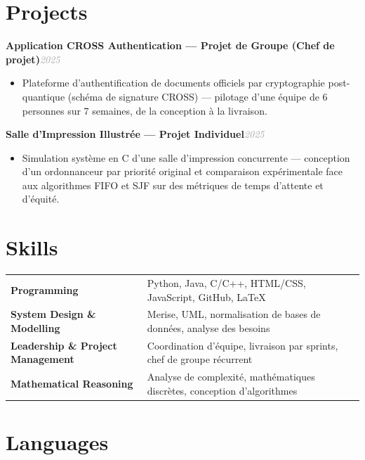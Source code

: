 \documentclass[10pt, a4paper]{article}
\newcommand{\entryhead}[2]{%
  \noindent\textbf{#1}\hfill{\small\textit{\textcolor{darkgray}{#2}}}\\[-4pt]%
}
\begin{document}
\section{Projects}

\entryhead{Application CROSS Authentication \normalfont\small— Projet de Groupe (Chef de projet)}{2025}
\begin{itemize}
  \item Plateforme d'authentification de documents officiels par cryptographie post-quantique
        (schéma de signature CROSS) — pilotage d'une équipe de 6 personnes sur 7 semaines,
        de la conception à la livraison.
\end{itemize}

\entryhead{Salle d'Impression Illustrée \normalfont\small— Projet Individuel}{2025}
\begin{itemize}
  \item Simulation système en C d'une salle d'impression concurrente — conception d'un
        ordonnanceur par priorité original et comparaison expérimentale face aux algorithmes
        FIFO et SJF sur des métriques de temps d'attente et d'équité.
\end{itemize}

\section{Skills}

\vspace{2pt}
\noindent
\begin{tabularx}{\linewidth}{@{} >{\bfseries}p{5.4cm} X @{}}
  Programming
    & Python, Java, C/C++, HTML/CSS, JavaScript, GitHub, \LaTeX \\[1pt]
  System Design \& Modelling
    & Merise, UML, normalisation de bases de données, analyse des besoins \\[1pt]
  Leadership \& Project Management
    & Coordination d'équipe, livraison par sprints, chef de groupe récurrent \\[1pt]
  Mathematical Reasoning
    & Analyse de complexité, mathématiques discrètes, conception d'algorithmes \\
\end{tabularx}

\section{Languages}
\end{document}
